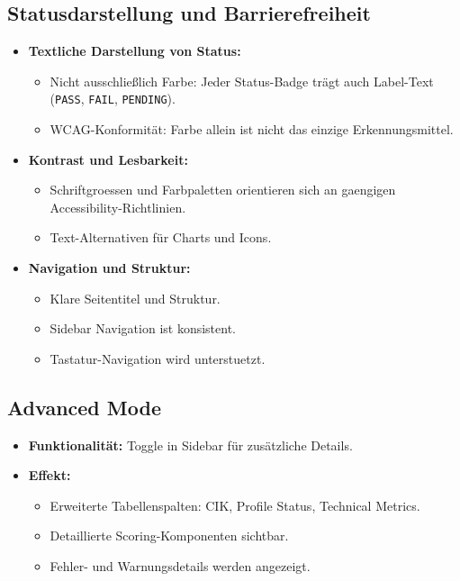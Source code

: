 \subsection{Statusdarstellung und Barrierefreiheit}
\begin{itemize}
  \item \textbf{Textliche Darstellung von Status:} %
    \begin{itemize}
      \item Nicht ausschließlich Farbe: Jeder Status-Badge trägt auch Label-Text (\texttt{PASS}, \texttt{FAIL}, \texttt{PENDING}). %
      \item WCAG-Konformität: Farbe allein ist nicht das einzige Erkennungsmittel. %
    \end{itemize}
  \item \textbf{Kontrast und Lesbarkeit:}
    \begin{itemize}
      \item Schriftgroessen und Farbpaletten orientieren sich an gaengigen Accessibility-Richtlinien. %
      \item Text-Alternativen für Charts und Icons.
    \end{itemize}
  \item \textbf{Navigation und Struktur:}
    \begin{itemize}
      \item Klare Seitentitel und Struktur.
      \item Sidebar Navigation ist konsistent.
      \item Tastatur-Navigation wird unterstuetzt. %
    \end{itemize}
\end{itemize}

\subsection{Advanced Mode}
\begin{itemize}
  \item \textbf{Funktionalität:} Toggle in Sidebar für zusätzliche Details. %
  \item \textbf{Effekt:}
    \begin{itemize}
      \item Erweiterte Tabellenspalten: CIK, Profile Status, Technical Metrics.
      \item Detaillierte Scoring-Komponenten sichtbar.
      \item Fehler- und Warnungsdetails werden angezeigt.
    \end{itemize}
\end{itemize}
